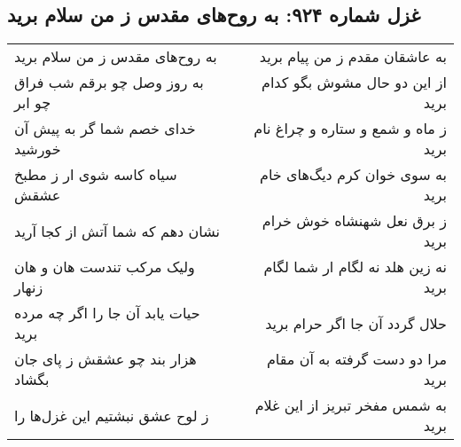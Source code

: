 \begin{center}
\section*{غزل شماره ۹۲۴: به روح‌های مقدس ز من سلام برید}
\label{sec:0924}
\begin{longtable}{l p{0.5cm} r}
به روح‌های مقدس ز من سلام برید
&&
به عاشقان مقدم ز من پیام برید
\\
به روز وصل چو برقم شب فراق چو ابر
&&
از این دو حال مشوش بگو کدام برید
\\
خدای خصم شما گر به پیش آن خورشید
&&
ز ماه و شمع و ستاره و چراغ نام برید
\\
سیاه کاسه شوی ار ز مطبخ عشقش
&&
به سوی خوان کرم دیگ‌های خام برید
\\
نشان دهم که شما آتش از کجا آرید
&&
ز برق نعل شهنشاه خوش خرام برید
\\
ولیک مرکب تندست هان و هان زنهار
&&
نه زین هلد نه لگام ار شما لگام برید
\\
حیات یابد آن جا را اگر چه مرده برید
&&
حلال گردد آن جا اگر حرام برید
\\
هزار بند چو عشقش ز پای جان بگشاد
&&
مرا دو دست گرفته به آن مقام برید
\\
ز لوح عشق نبشتیم این غزل‌ها را
&&
به شمس مفخر تبریز از این غلام برید
\\
\end{longtable}
\end{center}
